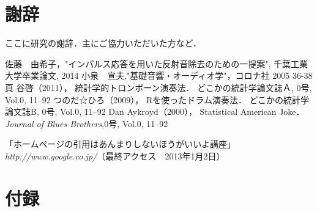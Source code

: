 \documentclass[a4j,12pt]{jarticle}
\begin{document}
\section*{謝辞}
ここに研究の謝辞．主にご協力いただいた方など．

\begin{thebibliography}{99}

佐藤　由希子，"インパルス応答を用いた反射音除去のための一提案", 千葉工業大学卒業論文, 2014
小泉　宣夫,"基礎音響・オーディオ学"，コロナ社 2005 36-38頁
谷啓（2011），
統計学的トロンボーン演奏法．
どこかの統計学論文誌Ａ, 0号, Vol.0, 11--92 
つのだ☆ひろ（2009），
Rを使ったドラム演奏法．
どこかの統計学論文誌B, 0号, Vol.0, 11--92 
Dan Aykroyd（2000），
Statistical American Joke．
{\it Journal of Blues Brothers},0号, Vol.0, 11--92 

「ホームページの引用はあんまりしないほうがいいよ講座」{\it http://www.google.co.jp/}（最終アクセス　2013年1月2日）
\end{thebibliography}

\section*{付録}
\end{document}
